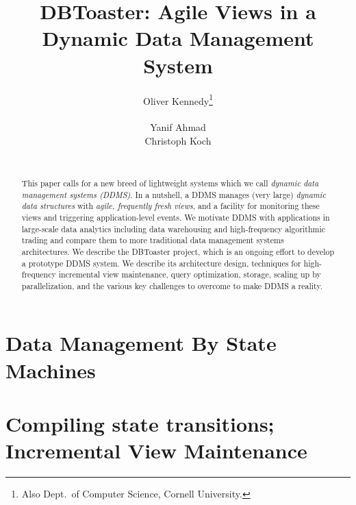 \documentclass{sig-alternate}
\begin{document}
\title{DBToaster: Agile Views in a\\Dynamic Data Management System}
\author{
\alignauthor
Oliver Kennedy\thanks{Also Dept.\ of Computer Science, Cornell University.}\\
     \\
\alignauthor
Yanif Ahmad\\
\alignauthor
Christoph Koch\\
     \\
}
\maketitle

\begin{abstract}
This paper calls for a new breed of lightweight systems which
we call {\em dynamic data management systems (DDMS)}\/.
In a nutshell,
a DDMS manages (very large) {\em dynamic data structures}\/ with 
{\em agile, frequently fresh views}\/, and a facility for monitoring
these views and triggering application-level events.
%
We motivate DDMS with applications in large-scale data analytics
including data warehousing and high-frequency algorithmic trading
and compare them to more traditional data management systems 
architectures.
%
We describe the DBToaster project, which is an ongoing effort to
develop a prototype DDMS system. We describe its architecture
design, techniques for high-frequency incremental view maintenance,
query optimization, storage, scaling up by parallelization, and
the various key challenges to overcome to make DDMS a reality.
\end{abstract}



\section{Data Management By State Machines}

\label{sec:overview}


\section{Compiling state transitions; Incremental View Maintenance}
\label{sec:dbtoaster}

\end{document}
